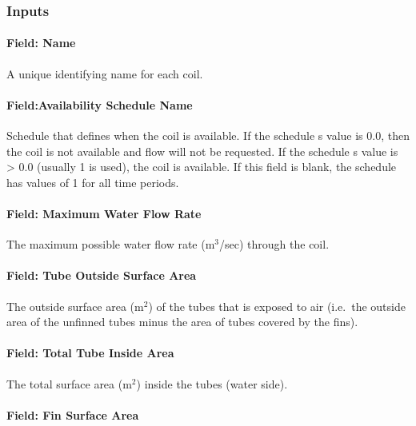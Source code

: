 \subsubsection{Inputs}\label{inputs-12-005}

\paragraph{Field: Name}\label{field-name-11-004}

A unique identifying name for each coil.

\paragraph{Field:Availability Schedule Name}\label{fieldavailability-schedule-name-5}

Schedule that defines when the coil is available. If the schedule s value is 0.0, then the coil is not available and flow will not be requested. If the schedule s value is \textgreater{} 0.0 (usually 1 is used), the coil is available. If this field is blank, the schedule has values of 1 for all time periods.

\paragraph{Field: Maximum Water Flow Rate}\label{field-maximum-water-flow-rate-1}

The maximum possible water flow rate (m\(^{3}\)/sec) through the coil.

\paragraph{Field: Tube Outside Surface Area}\label{field-tube-outside-surface-area}

The outside surface area (m\(^{2}\)) of the tubes that is exposed to air (i.e.~the outside area of the unfinned tubes minus the area of tubes covered by the fins).

\paragraph{Field: Total Tube Inside Area}\label{field-total-tube-inside-area}

The total surface area (m\(^{2}\)) inside the tubes (water side).

\paragraph{Field: Fin Surface Area}\label{field-fin-surface-area}


